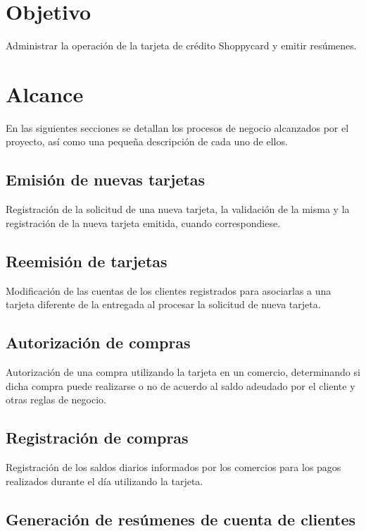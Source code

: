\section{Objetivo}

 Administrar la operación de la tarjeta de crédito Shoppycard y emitir resúmenes.


\section{Alcance}

En las siguientes secciones se detallan los procesos de negocio alcanzados por
el proyecto, así como una pequeña descripción de cada uno de ellos.

\subsection{Emisión de nuevas tarjetas}

Registración de la solicitud de una nueva tarjeta, la validación de la misma y
la registración de la nueva tarjeta emitida, cuando correspondiese.

\subsection{Reemisión de tarjetas}

Modificación de las cuentas de los clientes registrados para asociarlas a una
tarjeta diferente de la entregada al procesar la solicitud de nueva tarjeta.

\subsection{Autorización de compras}

Autorización de una compra utilizando la tarjeta en un comercio, determinando si
dicha compra puede realizarse o no de acuerdo al saldo adeudado por el cliente y
otras reglas de negocio.

\subsection{Registración de compras}

Registración de los saldos diarios informados por los comercios para los pagos
realizados durante el día utilizando la tarjeta.

\subsection{Generación de resúmenes de cuenta de clientes}

